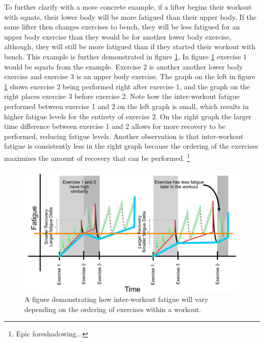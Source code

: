 To further clarify with a more concrete example, if a lifter begins their workout with squats, their lower body will be more fatigued than their upper body. If the same lifter then changes exercises to bench, they will be less fatigued for an upper body exercise than they would be for another lower body exercise, although, they will still be more fatigued than if they started their workout with bench. This example is further demonstrated in figure \ref{fig:P2C1_InterWorkoutExerciseOrder}. In figure \ref{fig:P2C1_InterWorkoutExerciseOrder} exercise 1 would be squats from the example. Exercise 2 is another another lower body exercise and exercise 3 is an upper body exercise. The graph on the left in figure \ref{fig:P2C1_InterWorkoutExerciseOrder} shows exercise 2 being performed right after exercise 1, and the graph on the right places exercise 3 before exercise 2. Note how the inter-workout fatigue performed between exercise 1 and 2 on the left graph is small, which results in higher fatigue levels for the entirety of exercise 2. On the right graph the larger time difference between exercise 1 and 2 allows for more recovery to be performed, reducing fatigue levels. Another observation is that inter-workout fatigue is consistently less in the right graph because the ordering of the exercises maximizes the amount of recovery that can be performed. \footnote{Epic foreshadowing...}

\begin{figure}[htb]
    \centering
    \includegraphics[scale=0.55]{images/p2/ch1/InterWorkoutExerciseOrder.png}
    \caption{A figure demonstrating how inter-workout fatigue will vary depending on the ordering of exercises within a workout.}
    \label{fig:P2C1_InterWorkoutExerciseOrder}
\end{figure}



